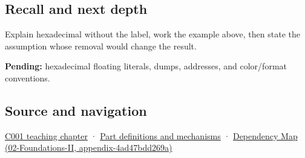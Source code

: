 \subsection{Recall and next depth}\label{recall-and-next-depth}

Explain hexadecimal without the label, work the example above, then state the assumption whose removal would change the result.

\textbf{Pending:} hexadecimal floating literals, dumps, addresses, and color/format conventions.

\subsection{Source and navigation}\label{source-and-navigation}

\href{Continuous\%20Notes/Computing\%20Foundations\%20-\%20From\%20Bits\%20to\%20C++\%20and\%20Systems\%20APIs\#From\%20a\%20signal\%20to\%20an\%20interpretation}{C001 teaching chapter} · \hyperref[appendix-fd090d982a15]{Part definitions and mechanisms} · \href{}{Dependency Map (02-Foundations-II, appendix-4ad47bdd269a)}
